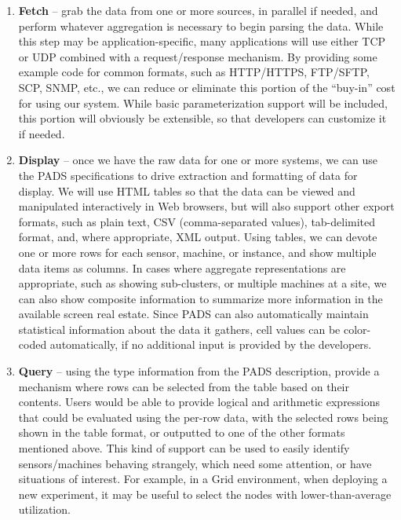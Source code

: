 \begin{enumerate}

\item {\bf Fetch} -- grab the data from one or more sources, in parallel if
needed, and perform whatever aggregation is necessary to begin parsing
the data. While this step may be application-specific, many
applications will use either TCP or UDP combined with a
request/response mechanism. By providing some example code for common
formats, such as HTTP/HTTPS, FTP/SFTP, SCP, SNMP, etc., we can reduce
or eliminate this portion of the ``buy-in'' cost for using our system.
While basic parameterization support will be included, this portion
will obviously be extensible, so that developers can customize it if
needed.

\item {\bf Display} -- once we have the raw data for one or more systems, we
can use the PADS specifications to drive extraction and formatting of
data for display. We will use HTML tables so that the data can be
viewed and manipulated interactively in Web browsers, but will also
support other export formats, such as plain text, CSV (comma-separated
values), tab-delimited format, and, where appropriate, XML
output. Using tables, we can devote one or more rows for each sensor,
machine, or instance, and show multiple data items as columns. In
cases where aggregate representations are appropriate, such as showing
sub-clusters, or multiple machines at a site, we can also show
composite information to summarize more information in the available
screen real estate. Since PADS can also automatically maintain
statistical information about the data it gathers, cell values can be
color-coded automatically, if no additional input is provided by the
developers.

\item {\bf Query} -- using the type information from the PADS description,
provide a mechanism where rows can be selected from the table based on
their contents. Users would be able to provide logical and arithmetic
expressions that could be evaluated using the per-row data, with the
selected rows being shown in the table format, or outputted to one of
the other formats mentioned above. This kind of support can be used to
easily identify sensors/machines behaving strangely, which need some
attention, or have situations of interest. For example, in a Grid
environment, when deploying a new experiment, it may be useful to
select the nodes with lower-than-average utilization.


\end{enumerate}
